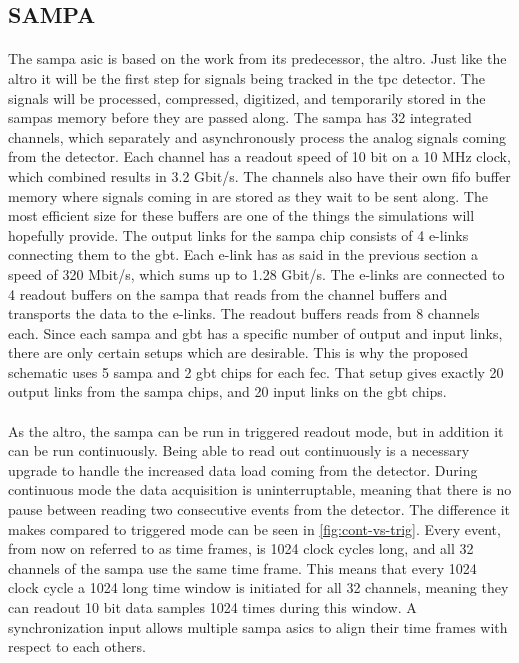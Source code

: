 \documentclass[a4paper, 12pt]{report}
\begin{document}
\subsection{SAMPA}
\label{subsec:sampa}
\paragraph{}
The \gls{sampa} \gls{asic} is based on the work from its predecessor, the \gls{altro}.
Just like the \gls{altro} it will be the first step for signals being tracked in the \gls{tpc} detector.
The signals will be processed, compressed, digitized, and temporarily stored in the \glspl{sampa} memory before they are passed along.
The \gls{sampa} has 32 integrated channels, which separately and asynchronously process the analog signals coming from the detector\cite{tdr-016}.
Each channel has a readout speed of 10 bit on a 10 MHz clock, which combined results in 3.2 Gbit/s.
The channels also have their own \gls{fifo} buffer memory where signals coming in are stored as they wait to be sent along.
The most efficient size for these buffers are one of the things the simulations will hopefully provide.
The output links for the \gls{sampa} chip consists of 4 e-links connecting them to the \gls{gbt}.
Each e-link has as said in the previous section a speed of 320 Mbit/s, which sums up to 1.28 Gbit/s\cite{tdr-015}.
The e-links are connected to 4 readout buffers on the \gls{sampa} that reads from the channel buffers and transports the data to the e-links.
The readout buffers reads from 8 channels each.
Since each \gls{sampa} and \gls{gbt} has a specific number of output and input links, there are only certain setups which are desirable.
This is why the proposed schematic uses 5 \gls{sampa} and 2 \gls{gbt} chips for each \gls{fec}.
That setup gives exactly 20 output links from the \gls{sampa} chips, and 20 input links on the \gls{gbt} chips.

\paragraph{}
As the \gls{altro}, the \gls{sampa} can be run in triggered readout mode, but in addition it can be run continuously.
Being able to read out continuously is a necessary upgrade to handle the increased data load coming from the detector.
During continuous mode the data acquisition is uninterruptable, meaning that there is no pause between reading two consecutive events from the detector.
The difference it makes compared to triggered mode can be seen in \ref{fig:cont-vs-trig}.
Every event, from now on referred to as time frames, is 1024 clock cycles long, and all 32 channels of the \gls{sampa} use the same time frame.
This means that every 1024 clock cycle a 1024 long time window is initiated for all 32 channels, meaning they can readout 10 bit data samples 1024 times during this window.
A synchronization input allows multiple \gls{sampa} \gls{asic}s to align their time frames with respect to each others.\cite{tdr-015}
\end{document}
